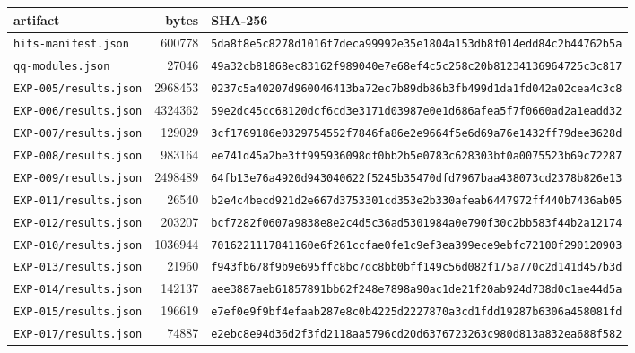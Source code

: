 \begin{tabular}{@{}>{\raggedright\arraybackslash}p{4.2cm}r>{\raggedright\arraybackslash}p{7cm}@{}}
\toprule
artifact & bytes & SHA-256\\
\midrule
\texttt{hits-manifest.json} & 600778 & \texttt{\scriptsize 5da8f8e5c8278d1016f7deca99992e35\allowbreak e1804a153db8f014edd84c2b44762b5a}\\
\texttt{qq-modules.json} & 27046 & \texttt{\scriptsize 49a32cb81868ec83162f989040e7e68e\allowbreak f4c5c258c20b81234136964725c3c817}\\
\texttt{EXP-005/results.json} & 2968453 & \texttt{\scriptsize 0237c5a40207d960046413ba72ec7b89\allowbreak db86b3fb499d1da1fd042a02cea4c3c8}\\
\texttt{EXP-006/results.json} & 4324362 & \texttt{\scriptsize 59e2dc45cc68120dcf6cd3e3171d0398\allowbreak 7e0e1d686afea5f7f0660ad2a1eadd32}\\
\texttt{EXP-007/results.json} & 129029 & \texttt{\scriptsize 3cf1769186e0329754552f7846fa86e2\allowbreak e9664f5e6d69a76e1432ff79dee3628d}\\
\texttt{EXP-008/results.json} & 983164 & \texttt{\scriptsize ee741d45a2be3ff995936098df0bb2b5\allowbreak e0783c628303bf0a0075523b69c72287}\\
\texttt{EXP-009/results.json} & 2498489 & \texttt{\scriptsize 64fb13e76a4920d943040622f5245b35\allowbreak 470dfd7967baa438073cd2378b826e13}\\
\texttt{EXP-011/results.json} & 26540 & \texttt{\scriptsize b2e4c4becd921d2e667d3753301cd353\allowbreak e2b330afeab6447972ff440b7436ab05}\\
\texttt{EXP-012/results.json} & 203207 & \texttt{\scriptsize bcf7282f0607a9838e8e2c4d5c36ad53\allowbreak 01984a0e790f30c2bb583f44b2a12174}\\
\texttt{EXP-010/results.json} & 1036944 & \texttt{\scriptsize 7016221117841160e6f261ccfae0fe1c\allowbreak 9ef3ea399ece9ebfc72100f290120903}\\
\texttt{EXP-013/results.json} & 21960 & \texttt{\scriptsize f943fb678f9b9e695ffc8bc7dc8bb0bf\allowbreak f149c56d082f175a770c2d141d457b3d}\\
\texttt{EXP-014/results.json} & 142137 & \texttt{\scriptsize aee3887aeb61857891bb62f248e7898a\allowbreak 90ac1de21f20ab924d738d0c1ae44d5a}\\
\texttt{EXP-015/results.json} & 196619 & \texttt{\scriptsize e7ef0e9f9bf4efaab287e8c0b4225d22\allowbreak 27870a3cd1fdd19287b6306a458081fd}\\
\texttt{EXP-017/results.json} & 74887 & \texttt{\scriptsize e2ebc8e94d36d2f3fd2118aa5796cd20\allowbreak d6376723263c980d813a832ea688f582}\\

\end{tabular}
